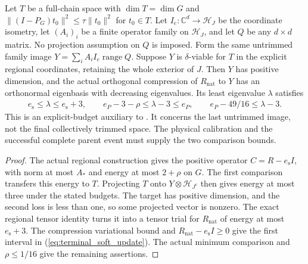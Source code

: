 \begin{lemma}
    Let $T$ be a full-chain space with $\dim T=\dim G$ and
    $\|(I-P_G)t_0\|^2\le\tau\|t_0\|^2$ for $t_0\in T$.
    Let $I_e:\mathbb C^d\to\mathcal H_J$ be the coordinate isometry,
    let $(A_i)_i$ be a finite operator family on $\mathcal H_J$,
    and let $Q$ be any $d\times d$ matrix. No projection assumption
    on $Q$ is imposed. Form the same untrimmed family image
    $Y=\sum_i A_i I_e\operatorname{range}Q$.
    Suppose $Y$ is $\delta$-viable for $T$ in the explicit regional
    coordinates, retaining the whole exterior of $J$.
    Then $Y$ has positive dimension, and the actual orthogonal
    compression of $R_{\mathrm{nat}}$ to $Y$ has an orthonormal
    eigenbasis with decreasing eigenvalues. Its least eigenvalue
    $\lambda$ satisfies
    \begin{align}
        e_{\mathrm s}\le\lambda\le e_{\mathrm s}+3,\qquad
        e_P-3-\rho\le\lambda-3\le e_P,\qquad
        e_P-49/16\le\lambda-3.\label{eq:terminal_soft_update}
    \end{align}
    This is an explicit-budget auxiliary to
    \cite[Figure~\texttt{fig:algo1}, line 1631, and lines 1793--1807]{Arad2016RigorousRG}.
    It concerns the last untrimmed image, not the final collectively
    trimmed space. The physical calibration and the successful complete
    parent event must supply the two comparison bounds.
\end{lemma}
\begin{proof}\leanok
    The actual regional construction gives the positive operator
    $C=R-e_{\mathrm s}I$, with norm at most $A_*$ and energy at most
    $2+\rho$ on $G$. The first comparison transfers this energy to $T$.
    Projecting $T$ onto $Y\otimes\mathcal H_{J^c}$ then gives energy
    at most three under the stated budgets. The target has positive
    dimension, and the second loss is less than one, so some projected
    vector is nonzero. The exact regional tensor identity turns it
    into a tensor trial for $R_{\mathrm{nat}}$ of energy at most
    $e_{\mathrm s}+3$. The compression variational bound and
    $R_{\mathrm{nat}}-e_{\mathrm s}I\ge0$ give the first interval in
    (\ref{eq:terminal_soft_update}). The actual minimum comparison and
    $\rho\le1/16$ give the remaining assertions.
\end{proof}

